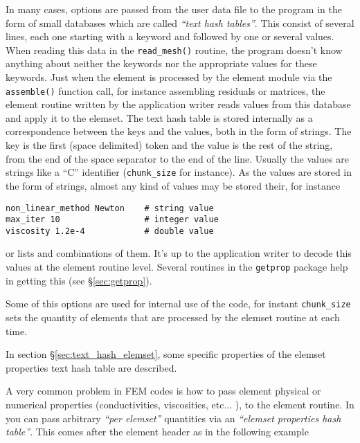 
%
In many cases, options are passed from the user data file to the
program in the form of small databases which are called \emph{``text
hash tables''}. This consist of several lines, each one starting with
a keyword and followed by one or several values.  When reading this
data in the \verb+read_mesh()+ routine, the program doesn't know
anything about neither the keywords nor the appropriate values for
these keywords. Just when the element is processed by the element
module via the \verb+assemble()+ function call, for instance
assembling residuals or matrices, the element routine written by the
application writer reads values from this database and apply it to the
elemset.  The text hash table is stored internally as a correspondence
between the keys and the values, both in the form of strings. The key
is the first (space delimited) token and the value is the rest of the
string, from the end of the space separator to the end of the
line. Usually the values are strings like a ``C'' identifier
(\verb+chunk_size+ for instance). As the values are stored in the form
of strings, almost any kind of values may be stored their, for
instance 
%
\begin{verbatim}
non_linear_method Newton    # string value
max_iter 10                 # integer value
viscosity 1.2e-4            # double value
\end{verbatim}
%
or lists and combinations of them. It's up
to the application writer to decode this values at the element routine
level. Several routines in the \verb+getprop+ package help in getting
this (see \S\ref{sec:getprop}).  

Some of this options are used for internal use of the \pfem{} code,
for instant \verb+chunk_size+ sets the quantity of elements that are
processed by the elemset routine at each time. 

In section \S\ref{sec:text_hash_elemset}, some specific properties of
the elemset properties text hash table are described. 

\label{sec:text_hash_elemset}  

%
A very common problem in FEM codes is how to pass element physical or
numerical properties (conductivities, viscosities, etc... ), to the
element routine. In \pfem{} you can pass arbitrary \emph{``per elemset''}
quantities via an \emph{``elemset properties hash table''}. This comes after the
element header as in the following example

